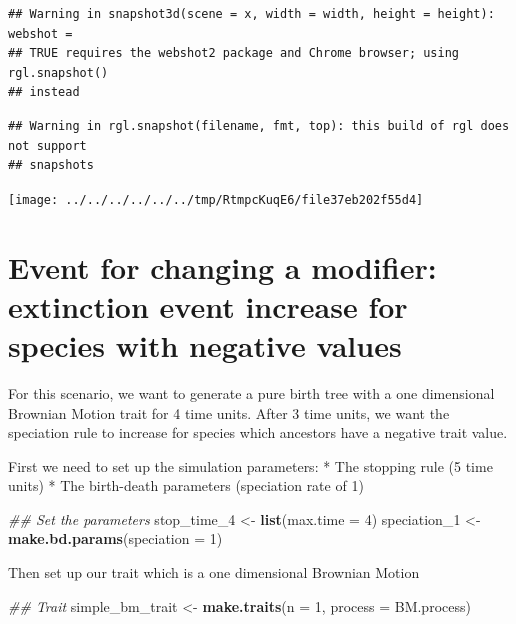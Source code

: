 \documentclass[
]{book}
\newenvironment{Shaded}{\begin{snugshade}}{\end{snugshade}}
\newcommand{\CommentTok}[1]{\textcolor[rgb]{0.56,0.35,0.01}{\textit{#1}}}
\newcommand{\DataTypeTok}[1]{\textcolor[rgb]{0.13,0.29,0.53}{#1}}
\newcommand{\DecValTok}[1]{\textcolor[rgb]{0.00,0.00,0.81}{#1}}
\newcommand{\KeywordTok}[1]{\textcolor[rgb]{0.13,0.29,0.53}{\textbf{#1}}}
\newcommand{\NormalTok}[1]{#1}
\newcommand{\StringTok}[1]{\textcolor[rgb]{0.31,0.60,0.02}{#1}}
\begin{document}
\begin{verbatim}
## Warning in snapshot3d(scene = x, width = width, height = height): webshot =
## TRUE requires the webshot2 package and Chrome browser; using rgl.snapshot()
## instead
\end{verbatim}

\begin{verbatim}
## Warning in rgl.snapshot(filename, fmt, top): this build of rgl does not support
## snapshots
\end{verbatim}

\texttt{[image: ../../../../../../tmp/RtmpcKuqE6/file37eb202f55d4]}

\hypertarget{EG_change_modif}{%
\section{Event for changing a modifier: extinction event increase for species with negative values}\label{EG_change_modif}}

For this scenario, we want to generate a pure birth tree with a one dimensional Brownian Motion trait for 4 time units.
After 3 time units, we want the speciation rule to increase for species which ancestors have a negative trait value.

First we need to set up the simulation parameters:
* The stopping rule (5 time units)
* The birth-death parameters (speciation rate of 1)

\begin{Shaded}
\begin{Highlighting}[]
\CommentTok{\#\# Set the parameters}
\NormalTok{stop\_time\_}\DecValTok{4}\NormalTok{ \textless{}{-}}\StringTok{ }\KeywordTok{list}\NormalTok{(}\DataTypeTok{max.time =} \DecValTok{4}\NormalTok{)}
\NormalTok{speciation\_}\DecValTok{1}\NormalTok{ \textless{}{-}}\StringTok{ }\KeywordTok{make.bd.params}\NormalTok{(}\DataTypeTok{speciation =} \DecValTok{1}\NormalTok{)}
\end{Highlighting}
\end{Shaded}

Then set up our trait which is a one dimensional Brownian Motion

\begin{Shaded}
\begin{Highlighting}[]
\CommentTok{\#\# Trait}
\NormalTok{simple\_bm\_trait \textless{}{-}}\StringTok{ }\KeywordTok{make.traits}\NormalTok{(}\DataTypeTok{n =} \DecValTok{1}\NormalTok{, }\DataTypeTok{process =}\NormalTok{ BM.process)}
\end{Highlighting}
\end{Shaded}
\end{document}
